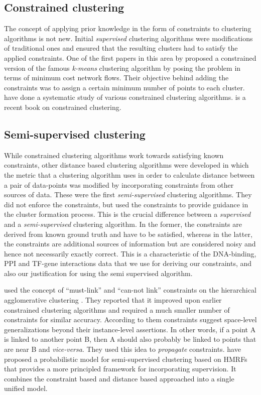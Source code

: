 \subsection{Constrained clustering}
The concept of applying prior knowledge in the form of constraints to clustering algorithms is not new. Initial \textit{supervised} clustering algorithms were modifications of traditional ones and ensured that the resulting clusters had to satisfy the applied constraints. One of the first papers in this area by \citet{bradley00constrained} proposed a constrained version of the famous \textit{k-means} \citep{MacQueen67kmeans} clustering algorithm by posing the problem in terms of minimum cost network flows. Their objective behind adding the constraints was to assign a certain minimum number of points to each cluster. \citet{tung2001constraint} have done a systematic study of various constrained clustering algorithms. \citet{basu2008constrained} is a recent book on constrained clustering.

\subsection{Semi-supervised clustering}
While constrained clustering algorithms work towards satisfying known constraints, other distance based clustering algorithms were developed in which the metric that a clustering algorithm uses in order to calculate distance between a pair of data-points was modified by incorporating constraints from other sources of data. These were the first \textit{semi-supervised} clustering algorithms. They did not enforce the constraints, but used the constraints to provide guidance in the cluster formation process. This is the crucial difference between a \textit{supervised} and a \textit{semi-supervised} clustering algorithm. In the former, the constraints are derived from known ground truth and have to be satisfied, whereas in the latter, the constraints are additional sources of information but are considered noisy and hence not necessarily exactly correct. This is a characteristic of the DNA-binding, PPI and TF-gene interactions data that we use for deriving our constraints, and also our justification for using the semi supervised algorithm. 

\citet{klein2002frominstance} used the concept of ``must-link'' and ``can-not link'' constraints on the hierarchical agglomerative clustering \citep{jain1988algorithms}. They reported that it improved upon earlier constrained clustering algorithms and required a much smaller number of constraints for similar accuracy. According to them constraints suggest space-level generalizations beyond their instance-level assertions. In other words, if a point A is linked to another point B, then A should also probably be linked to points that are near B and \textit{vice-versa}. They used this idea to \textit{propagate} constraints. \citet{basu2004probabilistic} have proposed a probabilistic model for semi-supervised clustering based on \acp{HMRF} that provides a more principled framework for incorporating supervision. It combines the constraint based and distance based approached into a single unified model.
 
